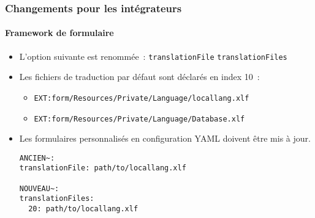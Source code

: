 \begin{frame}[fragile]
	\frametitle{Changements pour les intégrateurs}
	\framesubtitle{Framework de formulaire}

	\lstset{basicstyle=\tiny\ttfamily}

	\begin{itemize}
		\item L'option suivante est renommée~:\newline
			\small\texttt{translationFile} \textrightarrow\hspace{0.1cm}\texttt{translationFiles}\normalsize
		\item Les fichiers de traduction par défaut sont déclarés en index 10~:

			\begin{itemize}
				\item \texttt{EXT:form/Resources/Private/Language/locallang.xlf}
				\item \texttt{EXT:form/Resources/Private/Language/Database.xlf}
			\end{itemize}

		\item Les formulaires personnalisés en configuration YAML doivent être mis à jour.

\begin{lstlisting}
ANCIEN~:
translationFile: path/to/locallang.xlf

NOUVEAU~:
translationFiles:
  20: path/to/locallang.xlf
\end{lstlisting}

	\end{itemize}

\end{frame}


